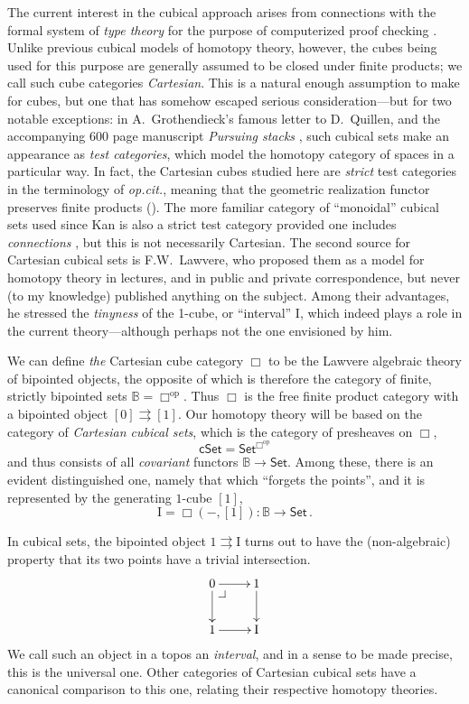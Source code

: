 \documentclass[11pt,reqno]{amsart}
\makeatletter
\newcommand{\opcit}{\emph{op.cit.}}
\newcommand{\B}{\ensuremath{\mathbb{B}}}
\newcommand{\psh}[1]{\ensuremath{\mathsf{Set}^{#1^{\mathrm{op}}}}}
\newcommand{\Set}{\ensuremath{\mathsf{Set}}}
\newcommand{\cSet}{\ensuremath{\mathsf{cSet}}}
\newcommand{\op}[1]{\ensuremath{{#1}^{\mathrm{op}}}}
\renewcommand{\to}{\ensuremath{\rightarrow}}
\newcommand{\too}{\ensuremath{\longrightarrow}}
\newcommand{\I}{\ensuremath{\mathrm{I}}}
\theoremstyle{remark}
\theoremstyle{definition}
\newcommand{\pbcorner}[1][dr]{\save*!/#1-1.2pc/#1:(-1,1)@^{|-}\restore}
\makeatother
\begin{document}
The current interest in the cubical approach arises from connections with the  formal system of \emph{type theory} for the purpose of computerized proof checking \cite{AwodeyCoquand:2013}.  Unlike previous cubical models of homotopy theory, however, the cubes being used for this purpose are generally assumed to be closed under finite products; we call such cube categories \emph{Cartesian}.  This is a natural enough assumption to make for cubes, but one that has somehow escaped serious consideration---but for two notable exceptions: in A.~Grothendieck's famous letter to D.~Quillen, and the accompanying 600 page manuscript \emph{Pursuing stacks} \cite{G:1983}, such cubical sets make an appearance as \emph{test categories}, which model the homotopy category of spaces in a particular way.  In fact, the Cartesian cubes studied here are \emph{strict} test categories in the terminology of \opcit, meaning that the geometric realization functor preserves finite products (\cite{BuchholtzMoorehouse}).  The more familiar category of ``monoidal'' cubical sets used since Kan is also a strict test category provided one includes \emph{connections} \cite{Maltsiniotis:2009}, but this is not necessarily Cartesian.  The second source for Cartesian cubical sets is F.W.~Lawvere, who proposed them as a model for homotopy theory in lectures, and in public and private correspondence, but never (to my knowledge) published anything on the subject.   Among their advantages, he stressed the \emph{tinyness} of the 1-cube, or ``interval'' $\I$, which indeed plays a role in the current theory---although perhaps not the one envisioned by him.

We can define \emph{the} Cartesian cube category $\Box$ to be the Lawvere algebraic theory of bipointed objects, the opposite of which is therefore the category of finite, strictly bipointed sets $\B = \op\Box$.  Thus $\Box$ is the free finite product category with a bipointed object $[0]\rightrightarrows [1]$.  Our homotopy theory will be based on the category of \emph{Cartesian cubical sets}, which is the category of presheaves on $\Box$,
\[
\cSet = \psh{\Box}
\]
and thus consists of all \emph{covariant} functors $\B\to\Set$. Among these, there is an evident distinguished one, namely that which ``forgets the points'', and it is represented by the generating $1$-cube $[1]$,
\[
\I = \Box(-,[1]) : \B \too\Set\,.
\]

In cubical sets, the bipointed object $1\rightrightarrows\I$ turns out to have the (non-algebraic) property that its two points have a trivial intersection.  
\[
\xymatrix{
0 \ar[d] \ar[r] \pbcorner & 1 \ar[d]  \\
1 \ar[r] & \I
}
\]
We call such an object in a topos an \emph{interval}, and in a sense to be made precise, this is the universal one.  Other categories of Cartesian cubical sets have a canonical comparison to this one, relating their respective homotopy theories.
\end{document}
